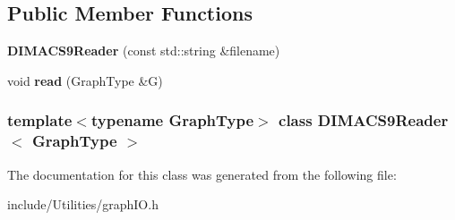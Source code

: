 \subsection*{Public Member Functions}
\begin{DoxyCompactItemize}
\item 
\hypertarget{class_d_i_m_a_c_s9_reader_ac690edb46ef2f1378a0982f5579a5f12}{
{\bfseries DIMACS9Reader} (const std::string \&filename)}
\label{class_d_i_m_a_c_s9_reader_ac690edb46ef2f1378a0982f5579a5f12}

\item 
\hypertarget{class_d_i_m_a_c_s9_reader_acf6b61bb80cc6276b730e6c3ecfe1dff}{
void {\bfseries read} (GraphType \&G)}
\label{class_d_i_m_a_c_s9_reader_acf6b61bb80cc6276b730e6c3ecfe1dff}

\end{DoxyCompactItemize}
\subsubsection*{template$<$typename GraphType$>$ class DIMACS9Reader$<$ GraphType $>$}



The documentation for this class was generated from the following file:\begin{DoxyCompactItemize}
\item 
include/Utilities/graphIO.h\end{DoxyCompactItemize}
